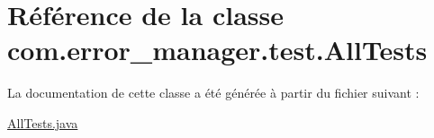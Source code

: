 \hypertarget{classcom_1_1error__manager_1_1test_1_1AllTests}{\section{Référence de la classe com.\-error\-\_\-manager.\-test.\-All\-Tests}
\label{classcom_1_1error__manager_1_1test_1_1AllTests}
}


La documentation de cette classe a été générée à partir du fichier suivant \-:\begin{DoxyCompactItemize}
\item 
\hyperlink{AllTests_8java}{All\-Tests.\-java}\end{DoxyCompactItemize}
